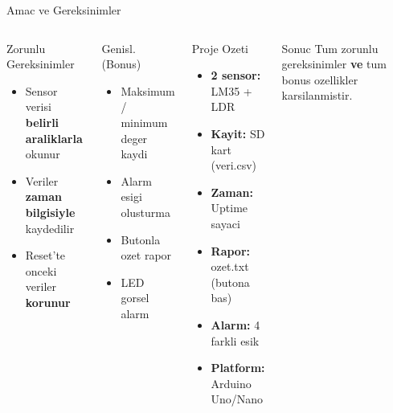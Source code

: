 \begin{frame}{Amac ve Gereksinimler}
  \begin{columns}[T]
      \begin{block}{Zorunlu Gereksinimler}
        \begin{itemize}
          \item Sensor verisi \textbf{belirli araliklarla} okunur
          \item Veriler \textbf{zaman bilgisiyle} kaydedilir
          \item Reset'te onceki veriler \textbf{korunur}
        \end{itemize}
      \end{block}
      \vspace{6pt}
      \begin{block}{Genisl. (Bonus)}
        \begin{itemize}
          \item Maksimum / minimum deger kaydi
          \item Alarm esigi olusturma
          \item Butonla ozet rapor
          \item LED gorsel alarm
        \end{itemize}
      \end{block}

      \begin{block}{Proje Ozeti}
        \begin{itemize}
          \item \textbf{2 sensor:} LM35 + LDR
          \item \textbf{Kayit:} SD kart (veri.csv)
          \item \textbf{Zaman:} Uptime sayaci
          \item \textbf{Rapor:} ozet.txt (butona bas)
          \item \textbf{Alarm:} 4 farkli esik
          \item \textbf{Platform:} Arduino Uno/Nano
        \end{itemize}
      \end{block}
      \vspace{6pt}
      \begin{alertblock}{Sonuc}
        \small Tum zorunlu gereksinimler \textbf{ve}
        tum bonus ozellikler karsilanmistir.
      \end{alertblock}
  \end{columns}
\end{frame}
